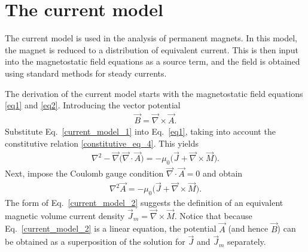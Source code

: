 \documentclass[11pt,a4paper,oneside]{book}
\numberwithin{equation}{section}
\theoremstyle{it}
\theoremstyle{definition}
\begin{document}
\section{The current model}
The current model is used in the analysis of permanent magnets. In this model, the magnet is reduced to a distribution of equivalent current. This is then input into the magnetostatic field equations as a source term, and the field is obtained using standard methods for steady currents. 

The derivation of the current model starts with the magnetostatic field equations \ref{eq1} and \ref{eq2}. Introducing the vector potential     
\begin{equation}\label{current_model_1}
	\begin{aligned}
		\vec{B} = \vec{\nabla}\times\vec{A}.
	\end{aligned}
\end{equation}
Substitute Eq.~\eqref{current_model_1} into Eq.~\eqref{eq1}, taking into account the constitutive relation \ref{constitutive_eq_4}. This yields
\begin{equation*}\label{}
	\begin{aligned}
		\nabla^2-\vec{\nabla}\Big(\vec{\nabla}\cdot\vec{A}\Big)=-\mu_0\Big(\vec{J}+\vec{\nabla}\times\vec{M}\Big).
	\end{aligned}
\end{equation*}
Next, impose the Coulomb gauge condition $\vec{\nabla}\cdot\vec{A}=0$ and obtain
\begin{equation}\label{current_model_2}
	\begin{aligned}
		\nabla^2 \vec{A}= -\mu_0\Big(\vec{J}+\vec{\nabla}\times\vec{M}\Big).
	\end{aligned}
\end{equation}
The form of Eq.~\eqref{current_model_2} suggests the definition of an equivalent magnetic volume current density $\vec{J}_m=\vec{\nabla}\times\vec{M}$. Notice that because Eq.~\eqref{current_model_2} is a linear equation, the potential $\vec{A}$ (and hence $\vec{B}$) can be obtained as a superposition of the solution for $\vec{J}$ and $\vec{J}_m$ separately.
\end{document}
